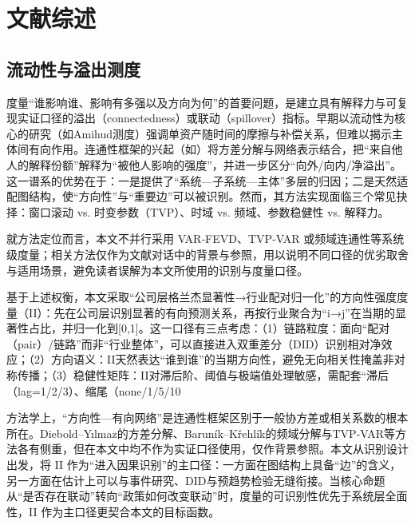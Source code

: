 \chapter{文献综述}
\label{chap:literature}

\section{流动性与溢出测度}
度量“谁影响谁、影响有多强以及方向为何”的首要问题，是建立具有解释力与可复现实证口径的溢出（connectedness）或联动（spillover）指标。早期以流动性为核心的研究（如Amihud测度）强调单资产随时间的摩擦与补偿关系，但难以揭示主体间有向作用。连通性框架的兴起（如\citep{billio2012econometric,diebold2012better,diebold2014connectedness}）将方差分解与网络表示结合，把“来自他人的解释份额”解释为“被他人影响的强度”，并进一步区分“向外/向内/净溢出”。这一谱系的优势在于：一是提供了“系统—子系统—主体”多层的归因；二是天然适配图结构，使“方向性”与“重要边”可以被识别。然而，其方法实现面临三个常见抉择：窗口滚动 vs. 时变参数（TVP）、时域 vs. 频域、参数稳健性 vs. 解释力。

就方法定位而言，本文不并行采用 VAR‑FEVD、TVP‑VAR 或频域连通性等系统级度量；相关方法仅作为文献对话中的背景与参照，用以说明不同口径的优劣取舍与适用场景，避免读者误解为本文所使用的识别与度量口径。

基于上述权衡，本文采取“公司层格兰杰显著性→行业配对归一化”的方向性强度度量（II）：先在公司层识别显著的有向预测关系，再按行业聚合为“i→j”在当期的显著性占比，并归一化到[0,1]。这一口径有三点考虑：（1）链路粒度：面向“配对（pair）/链路”而非“行业整体”，可以直接进入双重差分（DID）识别相对净效应；（2）方向语义：II天然表达“谁到谁”的当期方向性，避免无向相关性掩盖非对称传播；（3）稳健性矩阵：II对滞后阶、阈值与极端值处理敏感，需配套“滞后（lag=1/2/3）、缩尾（none/1/5/10%

方法学上，“方向性—有向网络”是连通性框架区别于一般协方差或相关系数的根本所在。Diebold–Yılmaz的方差分解、Baruník–Křehlík的频域分解与TVP‑VAR等方法各有侧重，但在本文中均不作为实证口径使用，仅作背景参照。本文从识别设计出发，将 II 作为“进入因果识别”的主口径：一方面在图结构上具备“边”的含义，另一方面在估计上可以与事件研究、DID与预趋势检验无缝衔接。当核心命题从“是否存在联动”转向“政策如何改变联动”时，度量的可识别性优先于系统层全面性，II 作为主口径更契合本文的目标函数。

